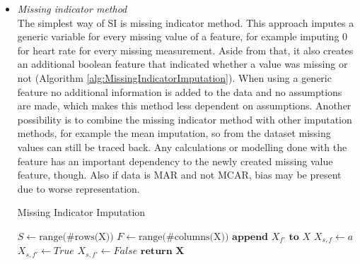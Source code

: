 \documentclass[10pt,a4paper]{article}
\begin{document}
	
	\begin{itemize}
		\item \textit{Missing indicator method} \\
		The simplest way of SI is missing indicator method. This approach imputes a generic variable for every missing value of a feature, for example imputing $0$ for heart rate for every missing measurement. Aside from that, it also creates an additional boolean feature that indicated whether a value was missing or not (Algorithm \ref{alg:MissingIndicatorImputation}). When using a generic feature no additional information is added to the data and no assumptions are made, which makes this method less dependent on assumptions\cite{pedersen2017missing}. Another possibility is to combine the missing indicator method with other imputation methods, for example the mean imputation, so from the dataset missing values can still be traced back. Any calculations or modelling done with the feature has an important dependency to the newly created missing value feature, though. Also if data is MAR and not MCAR, bias may be present due to worse representation\cite{donders2006gentle}.	
				
		\begin{algorithm}[H]
			\caption{Missing Indicator Imputation}\label{alg:MissingIndicatorImputation}
			\begin{algorithmic}[1]
				\State $S \gets \text{range(\#rows(X))}$ 	
				\State $F \gets \text{range(\#columns(X))}$ 	
				 					
				 				 			
				\State $\textbf{append } X_{f'} \textbf{ to } X$	
				 
				 				 
				\State $X_{s,f} \gets a$	
				\State $X_{s,f'} \gets True$	
				\Else
				\State $X_{s,f'} \gets False$ 
				\EndIf
				\EndFor
				\EndIf
				\EndFor
				\State $\textbf{return X}$
				\EndProcedure
			\end{algorithmic}
		\end{algorithm}
		

\end{itemize}
\end{document}
